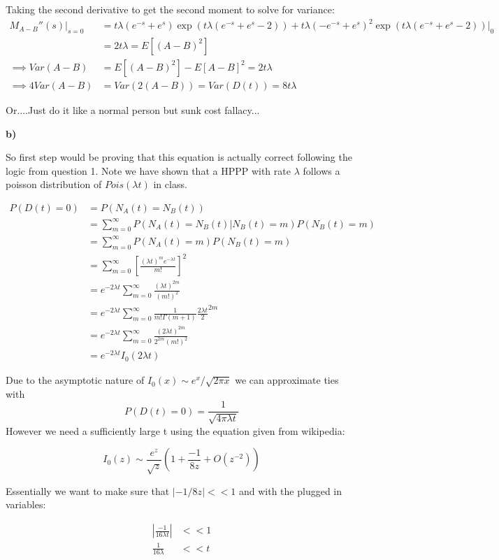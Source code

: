 \documentclass{article}
\begin{document}
Taking the second derivative to get the second moment to solve for variance:
\begin{align}
    M_{A-B}''(s)|_{s=0} &= t\lambda(e^{-s}+e^s)\exp(t\lambda(e^{-s}+e^s-2)) + 
    t\lambda(-e^{-s}+e^s)^2\exp(t\lambda(e^{-s}+e^s-2))|_0\\
    &= 2t\lambda =E[(A-B)^2]\\
    \implies Var(A-B) &= E[(A-B)^2] - E[A-B]^2 = 2t\lambda\\
    \implies 4Var(A-B) &= Var(2(A-B)) = \boxed{Var(D(t)) = 8t\lambda}
\end{align}

Or....Just do it like a normal person but sunk cost fallacy...

\textbf{b)}

So first step would be proving that this equation is actually correct following the logic from 
question 1. Note we have shown that a HPPP with rate $\lambda$ follows a poisson distribution of 
$Pois(\lambda t)$ in class.

\begin{align}
P(D(t) = 0) &= P(N_A(t) = N_B(t))\\
&=\sum_{m=0}^\infty P(N_A(t) = N_B(t)|N_B(t) = m)P(N_B(t) = m)\\
&=\sum_{m=0}^\infty P(N_A(t) = m)P(N_B(t) = m)\\
&= \sum_{m=0}^{\infty} \left[\frac{(\lambda t)^me^{-\lambda t}}{m!}\right]^2\\
&=  e^{-2\lambda t} \sum_{m=0}^\infty\frac{(\lambda t)^{2m}}{(m!)^2}\\
&=  e^{-2\lambda t} \sum_{m=0}^\infty\frac{1}{m!\Gamma(m+1)}\frac{2\lambda t}{2}^{2m}\\
&=  e^{-2\lambda t} \sum_{m=0}^\infty\frac{(2\lambda t)^{2m}}{2^{2m}(m!)^2}\\
&=  e^{-2\lambda t} I_0(2\lambda t)
\end{align}

Due to the asymptotic nature of $I_0(x) \sim e^x/\sqrt{2\pi x}$ we can approximate ties with
\[P(D(t) = 0) = \frac{1}{\sqrt{4\pi \lambda t}}\]
However we need a sufficiently large t using the equation given from wikipedia:

\[I_0(z) \sim \frac{e^{z}}{\sqrt{z}}(1+ \frac{-1}{8z}+O(z^{-2}))\]

Essentially we want to make sure that $|-1/8z| << 1$ and with the plugged in variables:

\begin{align}
    \left|\frac{-1}{16\lambda t}\right| &<< 1\\
    \frac{1}{16\lambda} &<< t\\
\end{align}
\end{document}
